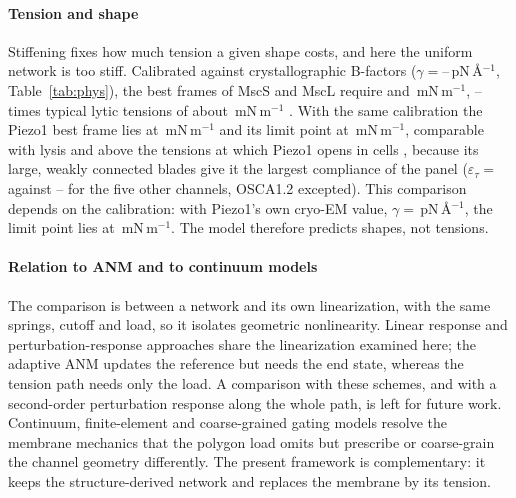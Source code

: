 \documentclass[preprint,12pt,a4paper]{elsarticle}
\newcommand{\eps}{\varepsilon}
\begin{document}
\paragraph{Tension and shape} Stiffening fixes how much tension a given shape costs, and here the uniform network is too stiff. Calibrated against crystallographic B-factors ($\gamma=$--\,pN\,\AA$^{-1}$, Table~\ref{tab:phys}), the best frames of MscS and MscL require  and \,mN\,m$^{-1}$, -- times typical lytic tensions of about \,mN\,m$^{-1}$ \citep{evans2003}. With the same calibration the Piezo1 best frame lies at \,mN\,m$^{-1}$ and its limit point at \,mN\,m$^{-1}$, comparable with lysis and above the tensions at which Piezo1 opens in cells \citep{lewis2015,cox2016}, because its large, weakly connected blades give it the largest compliance of the panel ($\eps_\tau=$ against -- for the five other channels, OSCA1.2 excepted). This comparison depends on the calibration: with Piezo1's own cryo-EM value, $\gamma=$\,pN\,\AA$^{-1}$, the limit point lies at \,mN\,m$^{-1}$. The model therefore predicts shapes, not tensions.

\paragraph{Relation to ANM and to continuum models} The comparison is between a network and its own linearization, with the same springs, cutoff and load, so it isolates geometric nonlinearity. Linear response and perturbation-response approaches \citep{ikeguchi2005,atilgan2009} share the linearization examined here; the adaptive ANM \citep{yang2009aanm} updates the reference but needs the end state, whereas the tension path needs only the load. A comparison with these schemes, and with a second-order perturbation response along the whole path, is left for future work. Continuum, finite-element and coarse-grained gating models \citep{wiggins2004,tang2006,bathe2008,yefimov2008,louhivuori2010} resolve the membrane mechanics that the polygon load omits but prescribe or coarse-grain the channel geometry differently. The present framework is complementary: it keeps the structure-derived network and replaces the membrane by its tension.
\end{document}
